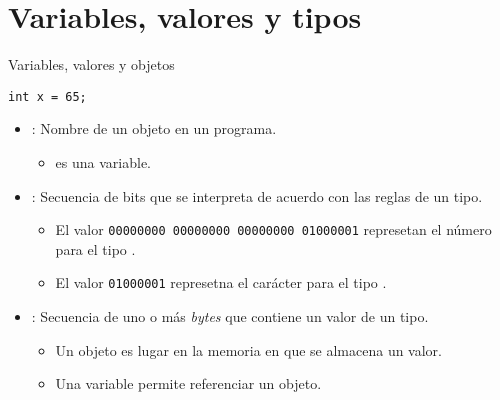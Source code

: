 \section{Variables, valores y tipos}

\begin{frame}[t,fragile]{Variables, valores y objetos}
\begin{lstlisting}
int x = 65;
\end{lstlisting}
\begin{itemize}
  \item {}: Nombre de un objeto en un programa.
    \begin{itemize}
      \item {} es una variable.
    \end{itemize}

  \item {}: Secuencia de bits que se interpreta de acuerdo con las reglas de un tipo.
    \begin{itemize}
      \item El valor \verb+00000000 00000000 00000000 01000001+ represetan el número  para el tipo .
      \item El valor \verb+01000001+ represetna el carácter  para el tipo .
    \end{itemize}

  \item {}: Secuencia de uno o más \emph{bytes} que contiene un valor de un tipo.
    \begin{itemize}
      \item Un objeto es lugar en la memoria en que se almacena un valor.
      \item Una variable permite referenciar un objeto.
    \end{itemize}
\end{itemize}
\end{frame}


